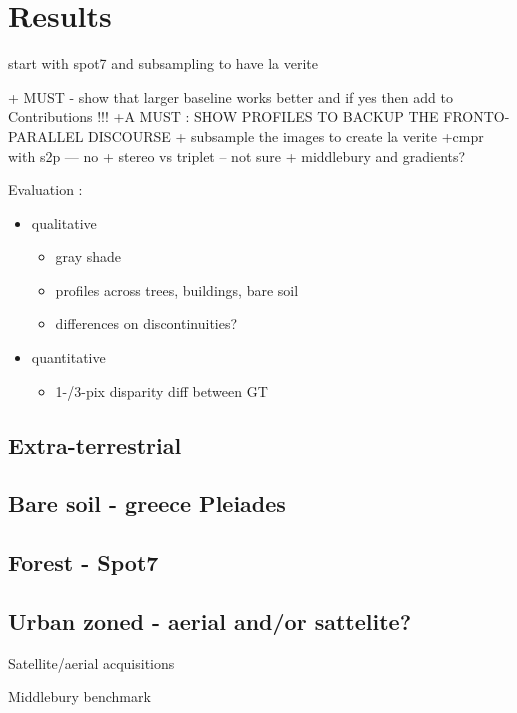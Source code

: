 \documentclass[journal]{IEEEtran}
\begin{document}
% 

\section{Results}

start with spot7 and subsampling to have la verite


+ MUST - show that larger baseline works better and if yes then add to Contributions !!!
+A MUST : SHOW PROFILES TO BACKUP THE FRONTO-PARALLEL DISCOURSE
+ subsample the images to create la verite
+cmpr with s2p --- no
+ stereo vs triplet -- not sure
+ middlebury and gradients?




Evaluation : \\
\begin{itemize}
\item qualitative  
	\begin{itemize}
	\item gray shade
	\item profiles across trees, buildings, bare soil
	\item differences on discontinuities?
	\end{itemize}
\item quantitative 
	\begin{itemize}
	\item 1-/3-pix disparity diff between GT 
	\end{itemize}
\end{itemize}
%
%
\subsection{Extra-terrestrial}
\subsection{Bare soil - greece Pleiades}
\subsection{Forest - Spot7}
\subsection{Urban zoned - aerial and/or sattelite?}

{Satellite/aerial acquisitions}

Middlebury benchmark

\end{document}
